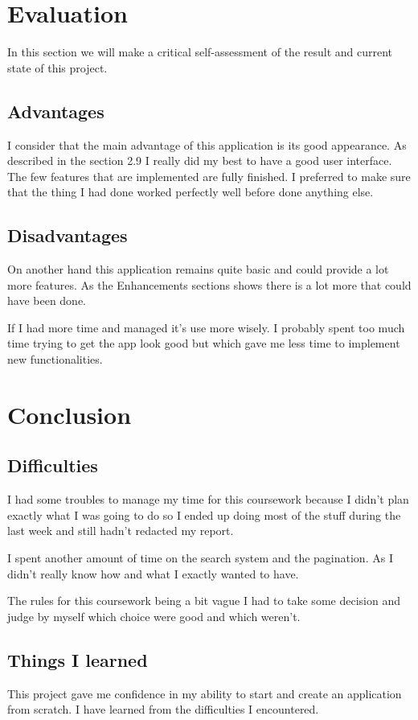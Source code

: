 \documentclass[10pt, a4paper]{article}
\begin{document}
	\section{Evaluation}
	In this section we will make a critical self-assessment of the result and current state of this project. 
	
	\subsection{Advantages} %
	I consider that the main advantage of this application is its good appearance. As described in the section 2.9 I really did my best to have a good user interface. The few features that are implemented are fully finished. I preferred to make sure that the thing I had done worked perfectly well before done anything else.
	
	\subsection{Disadvantages} %
	On another hand this application remains quite basic and could provide a lot more features. As the Enhancements sections shows there is a lot more that could have been done.
	
	If I had more time and managed it's use more wisely. I probably spent too much time trying to get the app look good but which gave me less time to implement new functionalities.
	
	

	\section{Conclusion} 
	\subsection{Difficulties}
	I had some troubles to manage my time for this coursework because I didn't plan exactly what  I was going to do so I ended up doing most of the stuff during the last week and still hadn't redacted my report.
	
	I spent another amount of time on the search system and the pagination. As I didn't really know how and what I exactly wanted to have.
	
	The rules for this coursework being a bit vague I had to take some decision and judge by myself which choice were good and which weren't.
	
	\subsection{Things I learned}
	This project gave me confidence in my ability to start and create an application from scratch. I have learned from the difficulties I encountered.
	
\end{document}
